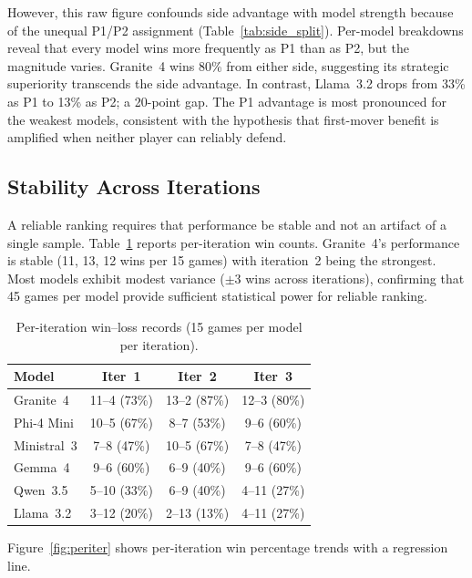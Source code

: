 \documentclass[11pt]{article}
\begin{document}
However, this raw figure confounds side advantage with model strength because of the unequal P1/P2 assignment (Table~\ref{tab:side_split}). Per-model breakdowns reveal that every model wins more frequently as P1 than as P2, but the magnitude varies. Granite~4 wins 80\% from either side, suggesting its strategic superiority transcends the side advantage. In contrast, Llama~3.2 drops from 33\% as P1 to 13\% as P2; a 20-point gap. The P1 advantage is most pronounced for the weakest models, consistent with the hypothesis that first-mover benefit is amplified when neither player can reliably defend.

\subsection{Stability Across Iterations}

A reliable ranking requires that performance be stable and not an artifact of a single sample. Table~\ref{tab:iterations} reports per-iteration win counts. Granite~4's performance is stable (11, 13, 12 wins per 15 games) with iteration~2 being the strongest. Most models exhibit modest variance ($\pm 3$ wins across iterations), confirming that 45 games per model provide sufficient statistical power for reliable ranking.

\begin{table}[H]
\centering
\caption{Per-iteration win--loss records (15 games per model per iteration).}
\label{tab:iterations}
\begin{tabular}{lccc}
\toprule
\textbf{Model} & \textbf{Iter~1} & \textbf{Iter~2} & \textbf{Iter~3} \\
\midrule
Granite~4   & 11--4 (73\%) & 13--2 (87\%) & 12--3 (80\%) \\
Phi-4 Mini  & 10--5 (67\%) &  8--7 (53\%) &  9--6 (60\%) \\
Ministral~3 &  7--8 (47\%) & 10--5 (67\%) &  7--8 (47\%) \\
Gemma~4     &  9--6 (60\%) &  6--9 (40\%) &  9--6 (60\%) \\
Qwen~3.5    &  5--10 (33\%) &  6--9 (40\%) &  4--11 (27\%) \\
Llama~3.2   &  3--12 (20\%) &  2--13 (13\%) &  4--11 (27\%) \\
\bottomrule
\end{tabular}
\end{table}

Figure~\ref{fig:periter} shows per-iteration win percentage trends with a regression line.
\end{document}
